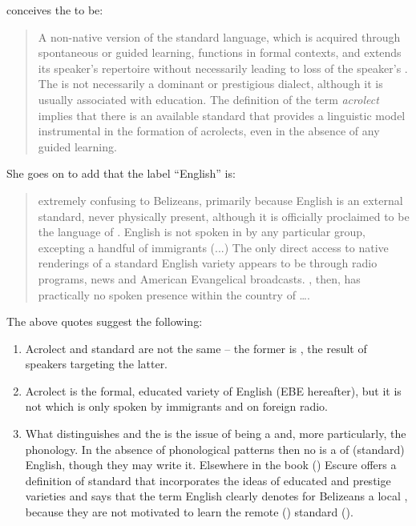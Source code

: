 \citet[67--68]{Escure1997} conceives the  to be:

\begin{quote}A non-native version of the standard language, which is acquired through spontaneous or guided learning, functions in formal contexts, and extends its speaker’s repertoire without necessarily leading to loss of the speaker’s .  The  is not necessarily a dominant or prestigious dialect, although it is usually associated with education.  The definition of the term \textit{acrolect} implies that there is an available standard that provides a linguistic model instrumental in the formation of acrolects, even in the absence of any guided learning.\end{quote}

She goes on to add that the label “English” is:

\begin{quote}extremely confusing to Belizeans, primarily because English is an external standard, never physically present, although it is officially proclaimed to be the language of .  English is not spoken in  by any particular group, excepting a handful of immigrants (...) The only direct access to native renderings of a standard English variety appears to be through radio programs,  news and American Evangelical broadcasts.  , then, has practically no spoken presence within the country of ….\end{quote}

The above quotes suggest the following:

\begin{enumerate}[label=\alph*)]
\item Acrolect and standard are not the same – the former is , the result of speakers targeting the latter.

\item Acrolect is the formal, educated  variety of English (EBE hereafter), but it is not  which is only spoken by immigrants and on foreign radio.

\item What distinguishes  and the  is the issue of being a  and, more particularly, the phonology.  In the absence of  phonological patterns then no  is a  of (standard) English, though they may write it.  Elsewhere in the book (\citeyear[66]{Escure1997}) Escure offers a definition of standard that incorporates the ideas of educated and prestige varieties and says that the term English clearly denotes for Belizeans a local , because they are not motivated to learn the remote () standard (\citeyear[73]{Escure1997}).   
\end{enumerate}

